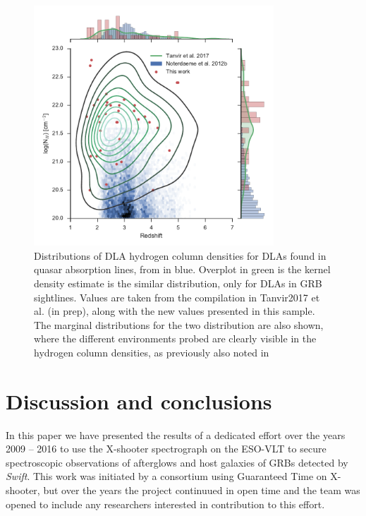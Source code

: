 \documentclass{aa}    %
\begin{document}
\begin{figure}
	\centering
	\includegraphics[width=9cm]{figures/NH_dist.pdf}
	\caption{Distributions of DLA hydrogen column densities for DLAs found in
		quasar absorption lines, from \citep{Noterdaeme2012b} in blue. Overplot in green is the kernel density estimate
		is the similar distribution, only for DLAs in GRB sightlines. Values are taken
		from the compilation in Tanvir2017 et al. (in prep)\citet{Tanvir2017}, along
		with the new values presented in this sample. The marginal distributions for
		the two distribution are also shown, where the different environments probed
		are clearly visible in the hydrogen column densities, as previously also noted
		in \citet{Fynbo2009}}
	\label{fig:NH_dist}
\end{figure}


\section{Discussion and conclusions}\label{conclusions}

In this paper we have presented the results of a dedicated effort over the
years 2009 -- 2016 to use the X-shooter spectrograph on the ESO-VLT to secure
spectroscopic observations of afterglows and host galaxies of GRBs detected by
{\it Swift}. This work was initiated by a consortium using Guaranteed Time on
X-shooter, but over the years the project continuued in open time and the team
was opened to include any researchers interested in contribution to this
effort.
\end{document}
